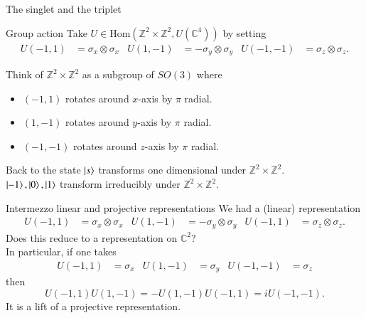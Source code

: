 \documentclass{beamer}
\newcommand{\CC}{\mathbb{C}}
\newcommand{\ZZ}{\mathbb{Z}}
\begin{document}
\begin{frame}{The singlet and the triplet}
	\begin{block}{Group action}
		Take $U\in \textrm{Hom}(\ZZ^2\times \ZZ^2,U(\CC^4))$ by setting
		\begin{align*}
		U(-1,1)&=\sigma_x\otimes \sigma_x&U(1,-1)&=-\sigma_y\otimes \sigma_y&U(-1,-1)&=\sigma_z\otimes \sigma_z.
		\end{align*}
	\end{block}
	Think of $\ZZ^2\times \ZZ^2$ as a subgroup of $SO(3)$ where
	\begin{itemize}
		\item $(-1,1)$ rotates around $x$-axis by $\pi$ radial.
		\item $(1,-1)$ rotates around $y$-axis by $\pi$ radial.
		\item $(-1,-1)$ rotates around $z$-axis by $\pi$ radial.
	\end{itemize}
	\pause
	\begin{block}{Back to the state}
		$\ket{s}$ transforms one dimensional under $\ZZ^2\times \ZZ^2$.\\
		$\ket{-1},\ket{0},\ket{1}$ transform irreducibly under $\ZZ^2\times \ZZ^2$.
	\end{block}
\end{frame}

\begin{frame}{Intermezzo linear and projective representations}
	We had a (linear) representation
	\begin{align*}
			U(-1,1)&=\sigma_x\otimes \sigma_x&U(1,-1)&=-\sigma_y\otimes \sigma_y&U(-1,1)&=\sigma_z\otimes \sigma_z.
	\end{align*}
	\pause
	Does this reduce to a representation on $\CC^2$?\\
	\pause
	In particular, if one takes
	\begin{align}
		U(-1,1)&=\sigma_x&U(1,-1)&=\sigma_y&U(-1,-1)&=\sigma_z
	\end{align}
	then
	\begin{equation}
		U(-1,1)U(1,-1)=-U(1,-1)U(-1,1)=i U(-1,-1).
	\end{equation}
	It is a lift of a projective representation.
\end{frame}
\end{document}
